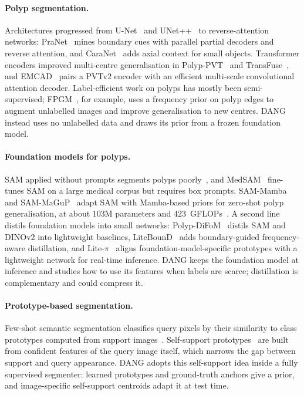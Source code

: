 \documentclass[10pt,twocolumn]{article}
\begin{document}
\paragraph{Polyp segmentation.} Architectures progressed from U-Net~\citep{ronneberger2015unet} and UNet++~\citep{zhou2018unetplusplus} to reverse-attention networks: PraNet~\citep{fan2020pranet} mines boundary cues with parallel partial decoders and reverse attention, and CaraNet~\citep{lou2022caranet} adds axial context for small objects. Transformer encoders improved multi-centre generalisation in Polyp-PVT~\citep{dong2021polyp} and TransFuse~\citep{zhang2021transfuse}, and EMCAD~\citep{rahman2024emcad} pairs a PVTv2 encoder with an efficient multi-scale convolutional attention decoder. Label-efficient work on polyps has mostly been semi-supervised; FPGM~\citep{xi2025fpgm}, for example, uses a frequency prior on polyp edges to augment unlabelled images and improve generalisation to new centres. DANG instead uses no unlabelled data and draws its prior from a frozen foundation model.

\paragraph{Foundation models for polyps.} SAM applied without prompts segments polyps poorly~\citep{zhou2023samPolyps}, and MedSAM~\citep{ma2024medsam} fine-tunes SAM on a large medical corpus but requires box prompts. SAM-Mamba~\citep{dutta2024sammamba} and SAM-MaGuP~\citep{dutta2025sammagup} adapt SAM with Mamba-based priors for zero-shot polyp generalisation, at about $103$M parameters and $423$~GFLOPs~\citep{agnihotri2026litebound}. A second line distils foundation models into small networks: Polyp-DiFoM~\citep{agnihotri2025difom} distils SAM and DINOv2 into lightweight baselines, LiteBounD~\citep{agnihotri2026litebound} adds boundary-guided frequency-aware distillation, and Lite-$\pi$~\citep{agnihotri2026litepi} aligns foundation-model-specific prototypes with a lightweight network for real-time inference. DANG keeps the foundation model at inference and studies how to use its features when labels are scarce; distillation is complementary and could compress it.

\paragraph{Prototype-based segmentation.} Few-shot semantic segmentation classifies query pixels by their similarity to class prototypes computed from support images~\citep{wang2019panet}. Self-support prototypes~\citep{fan2022ssp} are built from confident features of the query image itself, which narrows the gap between support and query appearance. DANG adopts this self-support idea inside a fully supervised segmenter: learned prototypes and ground-truth anchors give a prior, and image-specific self-support centroids adapt it at test time.
\end{document}

